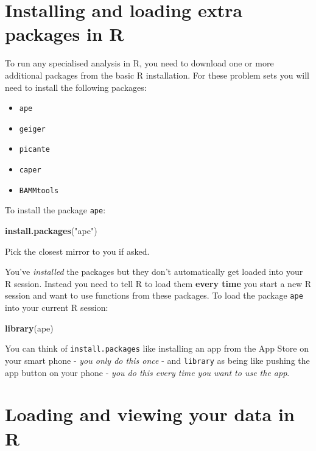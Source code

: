 \documentclass[]{book}
\newenvironment{Shaded}{\begin{snugshade}}{\end{snugshade}}
\newcommand{\KeywordTok}[1]{\textcolor[rgb]{0.13,0.29,0.53}{\textbf{{#1}}}}
\newcommand{\StringTok}[1]{\textcolor[rgb]{0.31,0.60,0.02}{{#1}}}
\newcommand{\NormalTok}[1]{{#1}}
\providecommand{\tightlist}{%
  \setlength{\itemsep}{0pt}\setlength{\parskip}{0pt}}
\begin{document}
\section{Installing and loading extra packages in
R}\label{installing-and-loading-extra-packages-in-r}

To run any specialised analysis in R, you need to download one or more
additional packages from the basic R installation. For these problem
sets you will need to install the following packages:

\begin{itemize}
\tightlist
\item
  \texttt{ape}
\item
  \texttt{geiger}
\item
  \texttt{picante}
\item
  \texttt{caper}
\item
  \texttt{BAMMtools}
\end{itemize}

To install the package \texttt{ape}:

\begin{Shaded}
\begin{Highlighting}[]
\KeywordTok{install.packages}\NormalTok{(}\StringTok{"ape"}\NormalTok{)}
\end{Highlighting}
\end{Shaded}

Pick the closest mirror to you if asked.

You've \emph{installed} the packages but they don't automatically get
loaded into your R session. Instead you need to tell R to load them
\textbf{every time} you start a new R session and want to use functions
from these packages. To load the package \texttt{ape} into your current
R session:

\begin{Shaded}
\begin{Highlighting}[]
\KeywordTok{library}\NormalTok{(ape)}
\end{Highlighting}
\end{Shaded}

You can think of \texttt{install.packages} like installing an app from
the App Store on your smart phone - \emph{you only do this once} - and
\texttt{library} as being like pushing the app button on your phone -
\emph{you do this every time you want to use the app}.

\section{Loading and viewing your data in
R}\label{loading-and-viewing-your-data-in-r}
\end{document}
